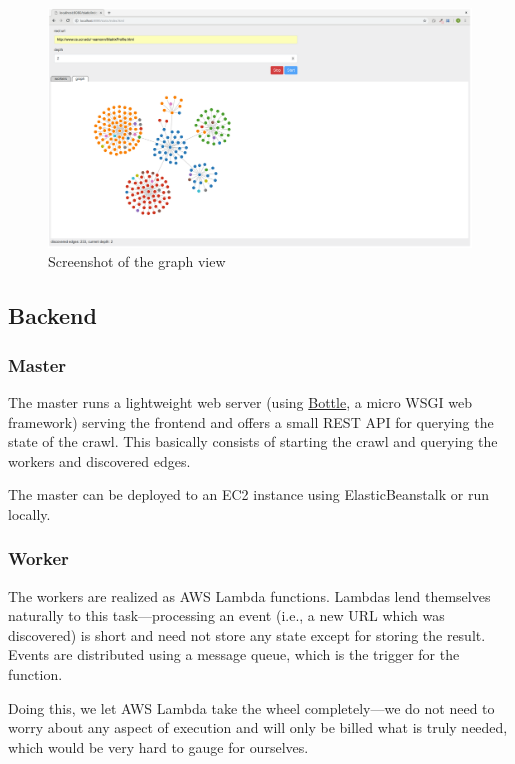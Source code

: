 \documentclass[english]{scrartcl}
\begin{document}
\begin{figure}
    \centering
    \includegraphics[width=\textwidth]{img/screenshot}
    \caption{Screenshot of the graph view}
    \label{fig:screenshot}
\end{figure}

\subsection{Backend}

\subsubsection{Master}

The master runs a lightweight web server (using
\href{https://bottlepy.org/docs/dev/}{Bottle}, a micro WSGI web framework)
serving the frontend and offers a small REST API for querying the state of the
crawl. This basically consists of starting the crawl and querying the workers
and discovered edges.

The master can be deployed to an EC2 instance using ElasticBeanstalk or run
locally.

\subsubsection{Worker}

The workers are realized as AWS Lambda functions. Lambdas lend themselves naturally
to this task---processing an event (i.e., a new URL which was discovered) is short
and need not store any state except for storing the result. Events are distributed
using a message queue, which is the trigger for the function.

Doing this, we let AWS Lambda take the wheel completely---we do not need to worry
about any aspect of execution and will only be billed what is truly needed, which
would be very hard to gauge for ourselves.
\end{document}
